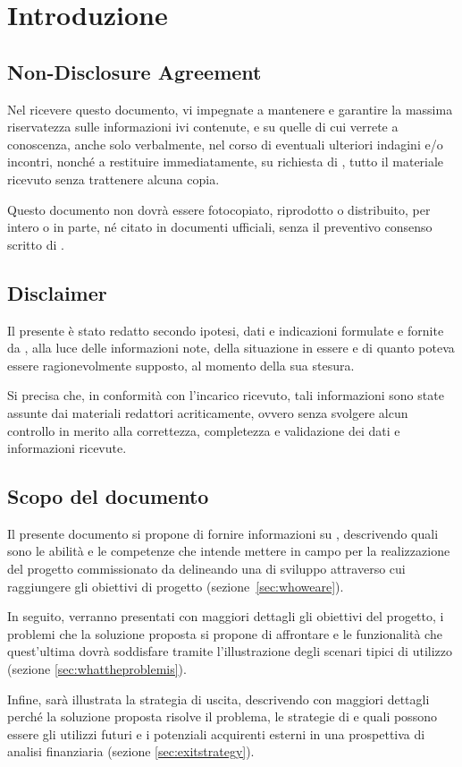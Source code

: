\section{Introduzione}

\subsection{Non-Disclosure Agreement}
Nel ricevere questo documento, vi impegnate a mantenere e garantire la massima riservatezza sulle informazioni ivi contenute, e su quelle di cui verrete a conoscenza, anche solo verbalmente, nel corso di eventuali ulteriori indagini e/o incontri, nonché a restituire immediatamente, su richiesta di \team, tutto il materiale ricevuto senza trattenere alcuna copia.

Questo documento non dovrà essere fotocopiato, riprodotto o distribuito, per intero o in parte, né citato in documenti ufficiali, senza il preventivo consenso scritto di \team.

\subsection{Disclaimer}
Il presente  è stato redatto secondo ipotesi, dati e indicazioni formulate e fornite da \customer, alla luce delle informazioni note, della situazione in essere e di quanto poteva essere ragionevolmente supposto, al momento della sua stesura.

Si precisa che, in conformità con l'incarico ricevuto, tali informazioni sono state assunte dai materiali redattori acriticamente, ovvero senza svolgere alcun controllo in merito alla correttezza, completezza e validazione dei dati e informazioni ricevute.


\subsection{Scopo del documento}
Il presente documento si propone di fornire informazioni su \team, descrivendo quali sono le abilità e le competenze che intende mettere in campo per la realizzazione del progetto commissionato da \customer delineando una  di sviluppo attraverso cui raggiungere gli obiettivi di progetto (sezione~\ref{sec:whoweare}).

In seguito, verranno presentati con maggiori dettagli gli obiettivi del progetto, i problemi che la soluzione proposta si propone di affrontare e le funzionalità che quest'ultima dovrà soddisfare tramite l'illustrazione degli scenari tipici di utilizzo (sezione \ref{sec:whattheproblemis}).
 
Infine, sarà illustrata la strategia di uscita, descrivendo con maggiori dettagli perché la soluzione proposta risolve il problema, le strategie di \mktg e quali possono essere gli utilizzi futuri e i potenziali acquirenti esterni in una prospettiva di analisi finanziaria (sezione \ref{sec:exitstrategy}).
